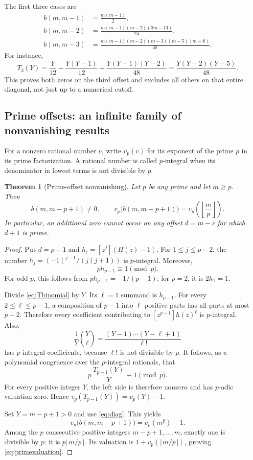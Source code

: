 \documentclass[11pt,a4paper]{article}
\numberwithin{equation}{section}
\newtheorem{theorem}{Theorem}[section]
\theoremstyle{definition}
\theoremstyle{remark}
\newcommand{\coef}[2]{[#1^{#2}]}
\newcommand{\fall}[2]{#1^{\underline{#2}}}
\begin{document}
The first three cases are
\begin{align}
 b(m,m-1)&=\frac{m(m-1)}2,\label{eq:d1}\\
 b(m,m-2)&=\frac{m(m-1)(m-2)(3m-13)}{24},\label{eq:d2}\\
 b(m,m-3)&=\frac{m(m-1)(m-2)(m-3)(m-5)(m-8)}{48}.
 \label{eq:d3}
\end{align}
For instance,
\[
 T_3(Y)=\frac{Y}{12}-\frac{Y(Y-1)}{12}
                  +\frac{Y(Y-1)(Y-2)}{48}
        =\frac{Y(Y-2)(Y-5)}{48}.
\]
This proves both zeros on the third offset and excludes all others on that
entire diagonal, not just up to a numerical cutoff.

\subsection{Prime offsets: an infinite family of nonvanishing results}
For a nonzero rational number $v$, write $v_p(v)$ for its exponent of the
prime $p$ in its prime factorization. A rational number is called
$p$-integral when its denominator in lowest terms is not divisible by $p$.

\begin{theorem}[Prime-offset nonvanishing]\label{thm:prime}
Let $p$ be any prime and let $m\ge p$. Then
\begin{equation}\label{eq:primevaluation}
 b(m,m-p+1)\ne0,\qquad
 v_p\bigl(b(m,m-p+1)\bigr)=v_p\left(\left\lfloor\frac mp\right\rfloor\right).
\end{equation}
In particular, an additional zero cannot occur on any offset $d=m-r$
for which $d+1$ is prime.
\end{theorem}
\begin{proof}
Put $d=p-1$ and $h_j=\coef{z}{j}(H(z)-1)$.
For $1\le j\le p-2$, the number
$h_j=(-1)^{j-1}/(j(j+1))$ is $p$-integral. Moreover,
\[
 p h_{p-1}\equiv1\pmod p.
\]
For odd $p$, this follows from $p h_{p-1}=-1/(p-1)$; for $p=2$, it is
$2h_1=1$.

Divide \eqref{eq:Tbinomial} by $Y$. Its $\ell=1$ summand is $h_{p-1}$.
For every $2\le\ell\le p-1$, a composition of $p-1$ into $\ell$ positive
parts has all parts at most $p-2$. Therefore every coefficient contributing
to $\coef{z}{p-1}h(z)^\ell$ is $p$-integral. Also,
\[
 \frac1Y\binom Y\ell
 =\frac{(Y-1)\cdots(Y-\ell+1)}{\ell!}
\]
has $p$-integral coefficients, because $\ell!$ is not divisible by $p$.
It follows, as a polynomial congruence over the $p$-integral rationals, that
\begin{equation}\label{eq:punit}
 p\,\frac{T_{p-1}(Y)}Y\equiv1\pmod p.
\end{equation}
For every positive integer $Y$, the left side is therefore nonzero and has
$p$-adic valuation zero. Hence
$v_p(T_{p-1}(Y))=v_p(Y)-1$.

Set $Y=m-p+1>0$ and use \eqref{eq:diag}. This yields
\[
 v_p\bigl(b(m,m-p+1)\bigr)=v_p(\fall m p)-1.
\]
Among the $p$ consecutive positive integers $m-p+1,\ldots,m$, exactly one
is divisible by $p$: it is $p\lfloor m/p\rfloor$. Its valuation is
$1+v_p(\lfloor m/p\rfloor)$, proving \eqref{eq:primevaluation}.
\end{proof}
\end{document}
